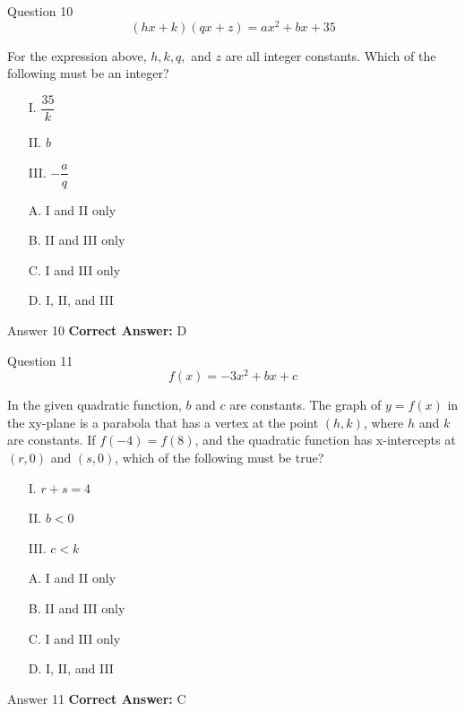 \documentclass{beamer}
\begin{document}
\begin{frame}{Question 10}
\small
\[
(hx+k)(qx+z) = ax^{2} + bx + 35
\]

For the expression above, $h, k, q,$ and $z$ are all integer constants.  
Which of the following must be an integer?

\begin{itemize}
\item[I.] $\dfrac{35}{k}$
\item[II.] $b$
\item[III.] $-\dfrac{a}{q}$
\end{itemize}
\vspace{0.35cm}
\begin{enumerate}
    \item[A.] I and II only
    \item[B.] II and III only
    \item[C.] I and III only
    \item[D.] I, II, and III
\end{enumerate}
\end{frame}
\begin{frame}{Answer 10}
\small
\textbf{Correct Answer:} D
\end{frame}

\begin{frame}{Question 11}
\small
\[
f(x)=-3x^{2}+bx+c
\]

In the given quadratic function, $b$ and $c$ are constants. The graph of $y=f(x)$ in the xy-plane is a parabola that has a vertex at the point $(h,k)$, where $h$ and $k$ are constants. If $f(-4)=f(8)$, and the quadratic function has x-intercepts at $(r,0)$ and $(s,0)$, which of the following must be true?

\begin{itemize}
\item[I.] $r+s=4$
\item[II.] $b<0$
\item[III.] $c<k$
\end{itemize}
\vspace{0.35cm}
\begin{enumerate}
    \item[A.] I and II only
    \item[B.] II and III only
    \item[C.] I and III only
    \item[D.] I, II, and III
\end{enumerate}
\end{frame}
\begin{frame}{Answer 11}
\small
\textbf{Correct Answer:} C
\end{frame}
\end{document}
